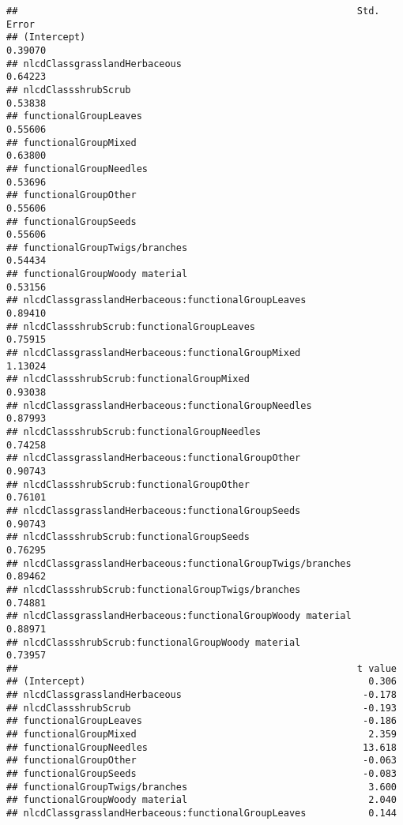 \documentclass[]{article}
\begin{document}
\begin{verbatim}
##                                                            Std. Error
## (Intercept)                                                   0.39070
## nlcdClassgrasslandHerbaceous                                  0.64223
## nlcdClassshrubScrub                                           0.53838
## functionalGroupLeaves                                         0.55606
## functionalGroupMixed                                          0.63800
## functionalGroupNeedles                                        0.53696
## functionalGroupOther                                          0.55606
## functionalGroupSeeds                                          0.55606
## functionalGroupTwigs/branches                                 0.54434
## functionalGroupWoody material                                 0.53156
## nlcdClassgrasslandHerbaceous:functionalGroupLeaves            0.89410
## nlcdClassshrubScrub:functionalGroupLeaves                     0.75915
## nlcdClassgrasslandHerbaceous:functionalGroupMixed             1.13024
## nlcdClassshrubScrub:functionalGroupMixed                      0.93038
## nlcdClassgrasslandHerbaceous:functionalGroupNeedles           0.87993
## nlcdClassshrubScrub:functionalGroupNeedles                    0.74258
## nlcdClassgrasslandHerbaceous:functionalGroupOther             0.90743
## nlcdClassshrubScrub:functionalGroupOther                      0.76101
## nlcdClassgrasslandHerbaceous:functionalGroupSeeds             0.90743
## nlcdClassshrubScrub:functionalGroupSeeds                      0.76295
## nlcdClassgrasslandHerbaceous:functionalGroupTwigs/branches    0.89462
## nlcdClassshrubScrub:functionalGroupTwigs/branches             0.74881
## nlcdClassgrasslandHerbaceous:functionalGroupWoody material    0.88971
## nlcdClassshrubScrub:functionalGroupWoody material             0.73957
##                                                            t value
## (Intercept)                                                  0.306
## nlcdClassgrasslandHerbaceous                                -0.178
## nlcdClassshrubScrub                                         -0.193
## functionalGroupLeaves                                       -0.186
## functionalGroupMixed                                         2.359
## functionalGroupNeedles                                      13.618
## functionalGroupOther                                        -0.063
## functionalGroupSeeds                                        -0.083
## functionalGroupTwigs/branches                                3.600
## functionalGroupWoody material                                2.040
## nlcdClassgrasslandHerbaceous:functionalGroupLeaves           0.144

\end{verbatim}
\end{document}
